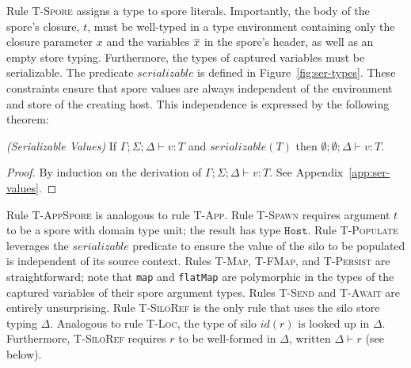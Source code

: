 Rule \textsc{T-Spore} assigns a type to spore literals. Importantly,
the body of the spore's closure, $t$, must be well-typed in a type
environment containing only the closure parameter $x$ and the
variables $\overline{x}$ in the spore's header, as well as an empty store
typing. Furthermore, the types of captured variables must be
serializable. The predicate $serializable$ is defined in
Figure~\ref{fig:ser-types}. These constraints ensure that spore values
are always independent of the environment and store of the creating
host. This independence is expressed by the following theorem:

\begin{thm}
\emph{(Serializable Values)}\label{lem:ser-values}
If $\Gamma ; \Sigma ; \Delta \vdash v : T$ and $serializable(T)$ then
$\emptyset ; \emptyset ; \Delta \vdash v : T$.
\end{thm}
\begin{proof}
By induction on the derivation of $\Gamma ; \Sigma ; \Delta \vdash v :
T$. See Appendix~\ref{app:ser-values}.
\end{proof}

Rule \textsc{T-AppSpore} is analogous to rule \textsc{T-App}. Rule
\textsc{T-Spawn} requires argument $t$ to be a spore with domain type
unit; the result has type $\texttt{Host}$.  Rule \textsc{T-Populate}
leverages the $serializable$ predicate to ensure the value of the silo
to be populated is independent of its source context. Rules
\textsc{T-Map}, \textsc{T-FMap}, and \textsc{T-Persist} are
straightforward; note that \verb|map| and \verb|flatMap| are
polymorphic in the types of the captured variables of their spore
argument types. Rules \textsc{T-Send} and \textsc{T-Await} are
entirely unsurprising. Rule \textsc{T-SiloRef} is the only rule that
uses the silo store typing $\Delta$. Analogous to rule \textsc{T-Loc},
the type of silo $id(r)$ is looked up in $\Delta$. Furthermore,
\textsc{T-SiloRef} requires $r$ to be well-formed in $\Delta$, written
$\Delta \vdash r$ (see below).



%
%


